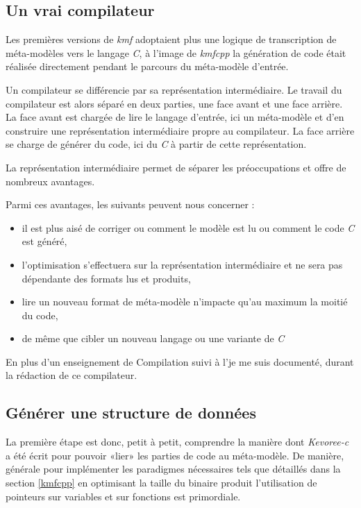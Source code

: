 \subsection{Un vrai compilateur}

Les premières versions de \emph{kmf} adoptaient plus une logique de transcription de méta-modèles vers le langage \emph{C}, à l'image de \emph{kmfcpp} la génération de code était réalisée directement pendant le parcours du méta-modèle d'entrée.

Un compilateur se différencie par sa représentation intermédiaire. Le travail du compilateur est alors séparé en deux parties, une face avant et une face arrière. La face avant est chargée de lire le langage d'entrée, ici un méta-modèle et d'en construire une représentation intermédiaire propre au compilateur. La face arrière se charge de générer du code, ici du \emph{C} à partir de cette représentation.

La représentation intermédiaire permet de séparer les préoccupations et offre de nombreux avantages.

Parmi ces avantages, les suivants peuvent nous concerner :
\begin{itemize}
\item il est plus aisé de corriger ou comment le modèle est lu ou comment le code \emph{C} est généré,
\item l'optimisation s'effectuera sur la représentation intermédiaire et ne sera pas dépendante des formats lus et produits,
\item lire un nouveau format de méta-modèle n'impacte qu'au maximum la moitié du code,
\item de même que cibler un nouveau langage ou une variante de \emph{C}
\end{itemize}

En plus d'un enseignement de Compilation suivi à l'\univname je me suis documenté\cite{aho2007compilateurs}, \cite{Appel2003MCI599718} durant la rédaction de ce compilateur.

\subsection{Générer une structure de données}

La première étape est donc, petit à petit, comprendre la manière dont \emph{Kevoree-c} a été écrit pour pouvoir «lier» les parties de code au méta-modèle. De manière, générale pour implémenter les paradigmes nécessaires tels que détaillés dans la section \ref{kmfcpp} en optimisant la taille du binaire produit l'utilisation de pointeurs sur variables et sur fonctions est primordiale.

